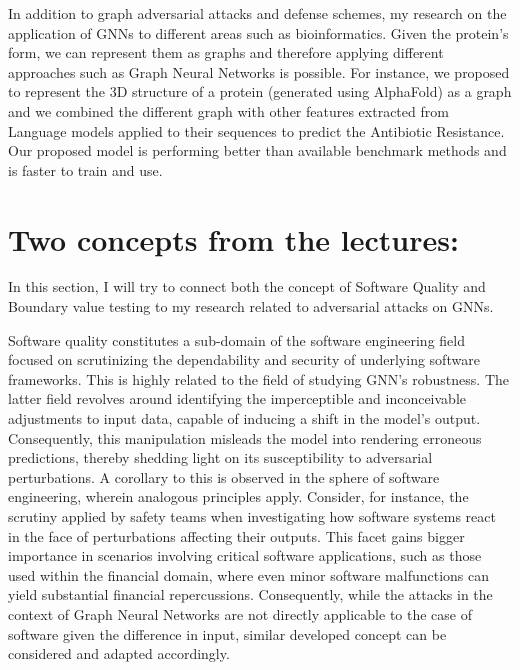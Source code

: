 \documentclass[a4paper,11pt]{article}
\begin{document}
\noindent In addition to graph adversarial attacks and defense schemes, my research on the application of GNNs to different areas such as bioinformatics. Given the protein’s form, we can represent them as graphs and therefore applying different approaches such as Graph Neural Networks is possible. For instance, we proposed to represent the 3D structure of a protein (generated using AlphaFold) as a graph and we combined the different graph with other features extracted from Language models applied to their sequences to predict the Antibiotic Resistance. Our proposed model is performing better than available benchmark methods and is faster to train and use.

\section{Two concepts from the lectures:}
In this section, I will try to connect both the concept of Software Quality and Boundary value testing to my research related to adversarial attacks on GNNs.

\noindent Software quality constitutes a sub-domain of the software engineering field focused on scrutinizing the dependability and security of underlying software frameworks. This is highly related to the field of studying GNN's robustness. The latter field revolves around identifying the imperceptible and inconceivable adjustments to input data, capable of inducing a shift in the model's output. Consequently, this manipulation misleads the model into rendering erroneous predictions, thereby shedding light on its susceptibility to adversarial perturbations. A corollary to this is observed in the sphere of software engineering, wherein analogous principles apply. Consider, for instance, the scrutiny applied by safety teams when investigating how software systems react in the face of perturbations affecting their outputs. This facet gains bigger importance in scenarios involving critical software applications, such as those used within the financial domain, where even minor software malfunctions can yield substantial financial repercussions. Consequently, while the attacks in the context of Graph Neural Networks are not directly applicable to the case of software given the difference in input, similar developed concept can be considered and adapted accordingly. \\ 
\end{document}
